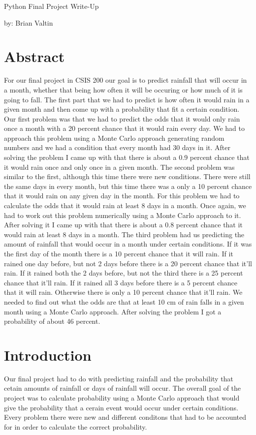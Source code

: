 \documentclass[12pt]{article}
\begin{document}
\begin{center}
{\huge Python  Final  Project  Write-Up}
  \vspace{5 mm}

by: Brian Valtin
\end{center}
\section{Abstract}
For our final project in CSIS 200 our goal is to predict rainfall that will occur in a month, whether that being how often it will be occuring or how much of it is going to fall. The first part that we had to predict is how often it would rain in a given month and then come up with a probability that fit a certain condition. Our first problem was that we had to predict the odds that it would only rain once a month with a 20 percent chance that it would rain every day. We had to approach this problem using a Monte Carlo approach generating random numbers and we had a condition that every month had 30 days in it. After solving the problem I came up with that there is about a 0.9 percent chance that it would rain once and only once in a given month. The second problem was similar to the first, although this time there were new conditions. There were still the same days in every month, but this time there was a only a 10 percent chance that it would rain on any given day in the month. For this problem we had to calculate the odds that it would rain at least 8 days in a month. Once again, we had to work out this problem numerically using a Monte Carlo approach to it. After solving it I came up with that there is about a 0.8 percent chance that it would rain at least 8 days in a month. The third problem had us predicting the amount of rainfall that would occur in a month under certain conditions. If it was the first day of the month there is a 10 percent chance that it will rain. If it rained one day before, but not 2 days before there is a 20 percent chance that it'll rain. If it rained both the 2 days before, but not the third there is a 25 percent chance that it'll rain. If it rained all 3 days before there is a 5 percent chance that it will rain. Otherwise there is only a 10 percent chance that it'll rain. We needed to find out what the odds are that at least 10 cm of rain falls in a given month using a Monte Carlo approach. After solving the problem I got a probability of about 46 percent.
\section{Introduction}
Our final project had to do with predicting rainfall and the probability that cetain amounts of rainfall or days of rainfall will occur. The overall goal of the project was to calculate probability using a Monte Carlo approach that would give the probability that a cerain event would occur under certain conditions. Every problem there were new and different conditons that had to be accounted for in order to calculate the correct probability.
\end{document}
